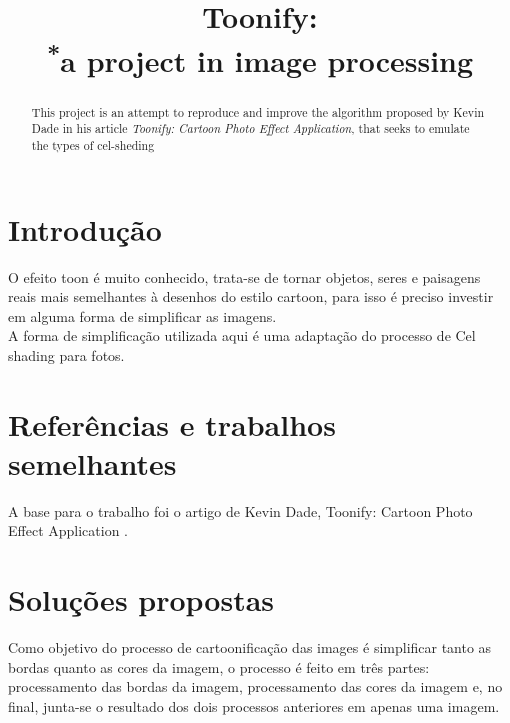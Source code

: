 \documentclass[10pt,technote]{IEEEtran}
\begin{document}
\title{Toonify:\\
{\footnotesize \textsuperscript{*}a project in image processing}
}
\author{
\and
{}
}

\maketitle
\begin{abstract}
This project is an attempt to reproduce and improve the algorithm proposed by Kevin Dade in his article\cite{CITE-artigobase}
\textit{Toonify: Cartoon Photo Effect Application}, that seeks to emulate the types of cel-sheding
\end{abstract}

\section{Introdução}
	O efeito toon é muito conhecido, trata-se de tornar objetos, seres e paisagens reais mais semelhantes à desenhos do estilo cartoon, para isso é preciso investir em alguma forma de simplificar as imagens.\\
	A forma de simplificação utilizada aqui é uma adaptação  do processo de Cel shading\cite{CITE-celshading} para fotos.  
	
\section{Referências e trabalhos semelhantes}

	A base para o trabalho foi o artigo de Kevin Dade, Toonify: Cartoon Photo Effect Application \cite{CITE-artigobase}.
	
\section{Soluções propostas}
	Como objetivo do processo de cartoonificação das images é simplificar tanto as bordas quanto as cores da imagem, o processo é feito em três partes: processamento das bordas da imagem, processamento das cores da imagem e, no final, junta-se o resultado dos dois processos anteriores em apenas uma imagem. 
	
\end{document}
